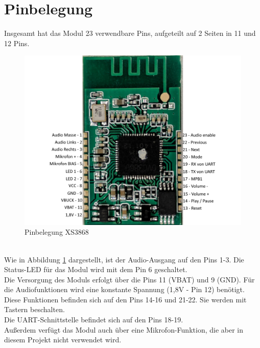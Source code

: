 \section{Pinbelegung}
Insgesamt hat das Modul 23 verwendbare Pins, aufgeteilt auf 2 Seiten in 11 und 12 Pins.
\begin{figure} [h]
	\centering
	\includegraphics[width=1\textwidth]{img/XS3868_Pinbelegung.png}
	\caption{Pinbelegung XS3868}\label {fig:abb2.2}
\end{figure}\\
Wie in Abbildung \ref{fig:abb2.2} dargestellt, ist der Audio-Ausgang auf den Pins 1-3. Die Status-LED für das Modul wird mit dem Pin 6 geschaltet.\\
Die Versorgung des Moduls erfolgt über die Pins 11 (VBAT) und 9 (GND). Für die Audiofunktionen wird eine konstante Spannung (1,8V - Pin 12) benötigt. Diese Funktionen befinden sich auf den Pins 14-16 und 21-22. Sie werden mit Tastern beschalten.\\
Die UART-Schnittstelle befindet sich auf den Pins 18-19.\\
Außerdem verfügt das Modul auch über eine Mikrofon-Funktion, die aber in diesem Projekt nicht verwendet wird.


